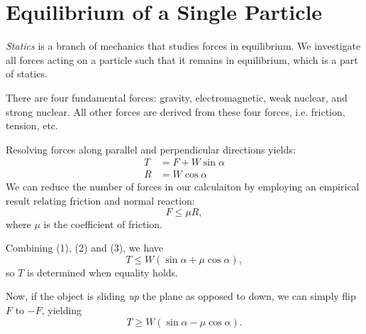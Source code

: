 \documentclass[12pt]{article}
\begin{document}

\section{Equilibrium of a Single Particle}

\emph{Statics} is a branch of mechanics that studies forces in equilibrium.
We investigate all forces acting on a particle such that it remains in equilibrium,
which is a part of statics.

There are four fundamental forces: 
gravity, electromagnetic, weak nuclear, and strong nuclear.
All other forces are derived from these four forces, i.e. 
friction, tension, etc.

\def\iangle{35} %
\def\down{-90}
\def\arcr{0.5cm} %


Resolving forces along parallel and perpendicular directions yields:
\begin{align}
    T &= F + W\sin\alpha \\
    R &= W\cos\alpha 
\end{align}
We can reduce the number of forces in our calculaiton
by employing an empirical result relating friction and normal reaction:
\begin{equation}
F \le \mu R,
\end{equation}
where $\mu$ is the coefficient of friction.

Combining (1), (2) and (3), we have
\begin{equation}
T \le W(\sin\alpha  + \mu\cos\alpha ),
\end{equation}
so $T$ is determined when equality holds.

Now, if the object is sliding \emph{up} the plane as opposed to down,
we can simply flip $F$ to $-F$, yielding
\begin{equation}
T \ge W(\sin\alpha  - \mu\cos\alpha ).
\end{equation}
\end{document}
